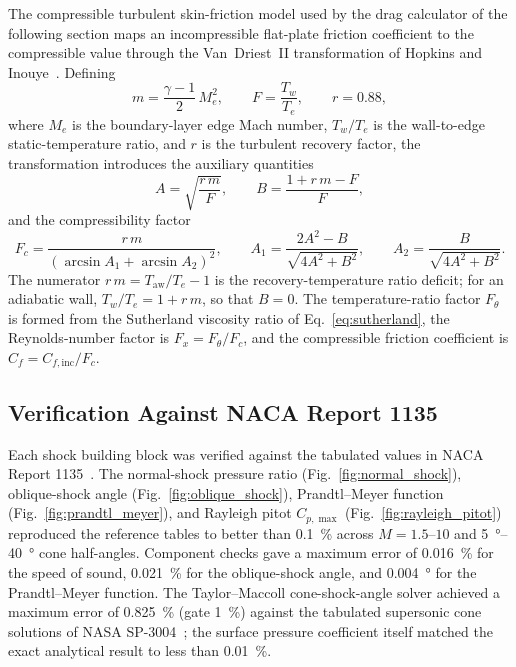 The compressible turbulent skin-friction model used by the drag calculator of
the following section maps an incompressible flat-plate friction coefficient to
the compressible value through the Van~Driest~II transformation of Hopkins and
Inouye~\cite{hopkins1971}. Defining
%
\begin{equation}
m = \frac{\gamma - 1}{2}\,M_e^2, \qquad
F = \frac{T_w}{T_e}, \qquad
r = 0.88,
\label{eq:vd2_defs}
\end{equation}
%
where $M_e$ is the boundary-layer edge Mach number, $T_w/T_e$ is the
wall-to-edge static-temperature ratio, and $r$ is the turbulent recovery
factor, the transformation introduces the auxiliary quantities
%
\begin{equation}
A = \sqrt{\frac{r\,m}{F}}, \qquad
B = \frac{1 + r\,m - F}{F},
\label{eq:vd2_AB}
\end{equation}
%
and the compressibility factor
%
\begin{equation}
F_c = \frac{r\,m}{\left(\arcsin A_1 + \arcsin A_2\right)^2}, \qquad
A_1 = \frac{2A^2 - B}{\sqrt{4A^2 + B^2}}, \qquad
A_2 = \frac{B}{\sqrt{4A^2 + B^2}}.
\label{eq:vd2_fc}
\end{equation}
%
The numerator $r\,m = T_{\mathrm{aw}}/T_e - 1$ is the recovery-temperature ratio
deficit; for an adiabatic wall, $T_w/T_e = 1 + r\,m$, so that $B = 0$. The
temperature-ratio factor $F_\theta$ is formed from the Sutherland viscosity
ratio of Eq.~\eqref{eq:sutherland}, the Reynolds-number factor is
$F_x = F_\theta/F_c$, and the compressible friction coefficient is
$C_f = C_{f,\mathrm{inc}}/F_c$.

\subsection{Verification Against NACA Report 1135}

Each shock building block was verified against the tabulated values in NACA
Report 1135~\cite{naca1135}. The normal-shock pressure ratio
(Fig.~\ref{fig:normal_shock}), oblique-shock angle
(Fig.~\ref{fig:oblique_shock}), Prandtl--Meyer function
(Fig.~\ref{fig:prandtl_meyer}), and Rayleigh pitot $C_{p,\max}$
(Fig.~\ref{fig:rayleigh_pitot}) reproduced the reference tables to better than
\SI{0.1}{\percent} across $M = 1.5$--$10$ and \SIrange{5}{40}{\degree} cone
half-angles. Component checks gave a maximum error of \SI{0.016}{\percent} for
the speed of sound, \SI{0.021}{\percent} for the oblique-shock angle, and
\SI{0.004}{\degree} for the Prandtl--Meyer function. The Taylor--Maccoll
cone-shock-angle solver achieved a maximum error of \SI{0.825}{\percent} (gate
\SI{1}{\percent}) against the tabulated supersonic cone solutions of NASA
SP-3004~\cite{sims1964,anderson2006}; the surface pressure coefficient itself
matched the exact analytical result to less than \SI{0.01}{\percent}.

